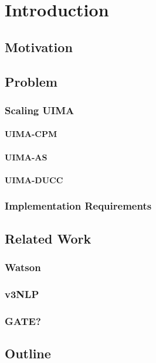 
\chapter{Introduction}



\section{Motivation}

\section{Problem}
\subsection{Scaling UIMA}
\subsubsection{UIMA-CPM}
\subsubsection{UIMA-AS}
\subsubsection{UIMA-DUCC}
\subsection{Implementation Requirements}


\section{Related Work}

\subsection{Watson}

\subsection{v3NLP}

\subsection{GATE?}

\section{Outline}